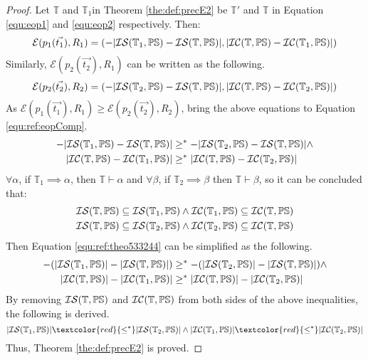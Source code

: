 \documentclass[11pt,letterpaper]{article}
\newcommand{\red}[1]{\textcolor{red}{#1}}
\newcommand{\theory}{\mathbb{T}}
\newcommand{\struc}{\mathbb{PS}}
\newcommand{\incompa}{{\cal IC}(\theory,\struc)}
\newcommand{\insuffa}{{\cal IS}(\theory,\struc)}
\begin{document}
\begin{proof}
Let $\theory$ and $\theory_1$in Theorem \ref{the:def:precE2} be $\theory'$ and $\theory$ in Equation \ref{equ:eop1} and \ref{equ:eop2} respectively. Then:
 \begin{align*}
    \mathcal{E}(p_1(\vec{t_1}), R_1)=(
     -|\mathcal{IS}(\theory_1, \mathbb{PS}) - \insuffa |,
     |\incompa -\mathcal{IC}(\theory_1, \mathbb{PS})|)
 \end{align*}
 Similarly, $\mathcal{E}(p_2(\vec{t_2}), R_1)$ can be written as the following.
  \begin{align*}
    \mathcal{E}(p_2(\vec{t_2}), R_2)=(
     -|\mathcal{IS}(\theory_2, \mathbb{PS}) -\insuffa|,
     |\incompa -\mathcal{IC}(\theory_2, \mathbb{PS})|)
 \end{align*}
 As $\mathcal{E}(p_1(\vec{t_1}), R_1) \geq\mathcal{E}(p_2(\vec{t_2}), R_2)$, bring the above equations to Equation \ref{equ:ref:eopComp}. 
 \begin{equation}\label{equ:ref:theo533244}
 \begin{aligned}
     -|\mathcal{IS}(\theory_1, \mathbb{PS}) - \insuffa |  &\geq^*
     -|\mathcal{IS}(\theory_2, \mathbb{PS}) - \insuffa | \wedge \\
     |\incompa -\mathcal{IC}(\theory_1, \mathbb{PS})| &\geq^*
      |\incompa -\mathcal{IC}(\theory_2, \mathbb{PS})| 
 \end{aligned}
 \end{equation}
$\forall \alpha$, if $\theory_1 \implies \alpha$, then $\theory \vdash \alpha$ and $\forall \beta$, if $\theory_2 \implies \beta$ then $\theory \vdash \beta$, so it can be concluded that:
\begin{equation}
\begin{aligned}
    \insuffa \subseteq \mathcal{IS}(\theory_1, \mathbb{PS})   \wedge  \mathcal{IC}(\theory_1, \mathbb{PS}) \subseteq \incompa  \\
  \insuffa \subseteq \mathcal{IS}(\theory_2, \mathbb{PS}) \wedge \mathcal{IC}(\theory_2, \mathbb{PS})  \subseteq \incompa 
\end{aligned}
 \end{equation}
Then Equation \ref{equ:ref:theo533244} can be simplified as the following.
\begin{equation}
 \begin{aligned}
     -(|\mathcal{IS}(\theory_1, \mathbb{PS}) |  - |\insuffa|) &\geq^*
     -(|\mathcal{IS}(\theory_2, \mathbb{PS}) | - |\insuffa| ) \wedge \\
     |\incompa| - |\mathcal{IC}(\theory_1, \mathbb{PS})|  &\geq^*
      |\incompa| - |\mathcal{IC}(\theory_2, \mathbb{PS})|
 \end{aligned}
 \end{equation}
 By removing $\insuffa$ and $\incompa$ from both sides of the above inequalities, the following is derived.
 \begin{equation}
     |\mathcal{IS}(\theory_1, \mathbb{PS})|  \red{\leq^*}
      |\mathcal{IS}(\theory_2, \mathbb{PS})| \wedge 
     |\mathcal{IC}(\theory_1, \mathbb{PS})| \red{\leq^*}
      |\mathcal{IC}(\theory_2, \mathbb{PS})| 
 \end{equation}
 Thus, Theorem \ref{the:def:precE2} is proved.
\end{proof}
\end{document}
